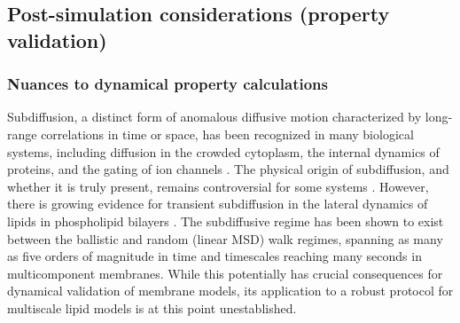 \documentclass[9pt,bestpractices]{livecoms}
\begin{document}
\subsection{Post-simulation considerations (property validation)}
\label{subsec:postsim4}

\subsubsection{Nuances to dynamical property calculations}
\label{subsubsec:dynamicalnuances}
Subdiffusion, a distinct form of anomalous diffusive motion characterized by long-range correlations in time or space, has been recognized in many biological systems, including diffusion in the crowded cytoplasm, the internal dynamics of proteins, and the gating of ion channels \cite{Nagle1992,Weiss2004,Kou2004,Goychuk2004}.
The physical origin of subdiffusion, and whether it is truly present, remains controversial for some systems \cite{Saxton2012}.
However, there is growing evidence for transient subdiffusion in the lateral dynamics of lipids in phospholipid bilayers \cite{Munguira2016}.
The subdiffusive regime has been shown to exist between the ballistic and random (linear MSD) walk regimes, spanning as many as five orders of magnitude in time and timescales reaching many seconds in multicomponent membranes.
While this potentially has crucial consequences for dynamical validation of membrane models, its application to a robust protocol for multiscale lipid models is at this point unestablished.
\end{document}
